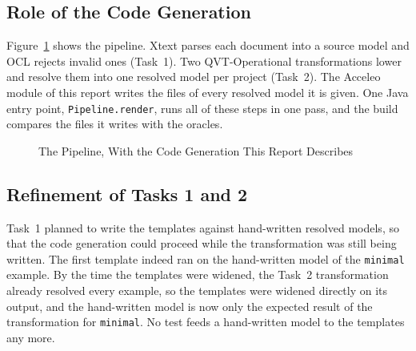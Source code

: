 \subsection{Role of the Code Generation}
\label{sec:role}

Figure~\ref{fig:pipeline} shows the pipeline. Xtext parses each document into a
source model and OCL rejects invalid ones (Task~1). Two QVT-Operational
transformations lower and resolve them into one resolved model per project
(Task~2). The Acceleo module of this report writes the files of every resolved
model it is given. One Java entry point, \texttt{Pipeline.render}, runs all of
these steps in one pass, and the build compares the files it writes with the
oracles.

\begin{figure}[!htbp]
\centering
{}
\caption{The Pipeline, With the Code Generation This Report Describes}
\label{fig:pipeline}
\end{figure}

\subsection{Refinement of Tasks 1 and 2}
\label{sec:refinement}

Task~1 planned to write the templates against hand-written resolved models, so
that the code generation could proceed while the transformation was still being
written. The first template indeed ran on the hand-written model of the
\texttt{minimal} example. By the time the templates were widened, the Task~2
transformation already resolved every example, so the templates were widened
directly on its output, and the hand-written model is now only the expected
result of the transformation for \texttt{minimal}. No test feeds a hand-written
model to the templates any more.

